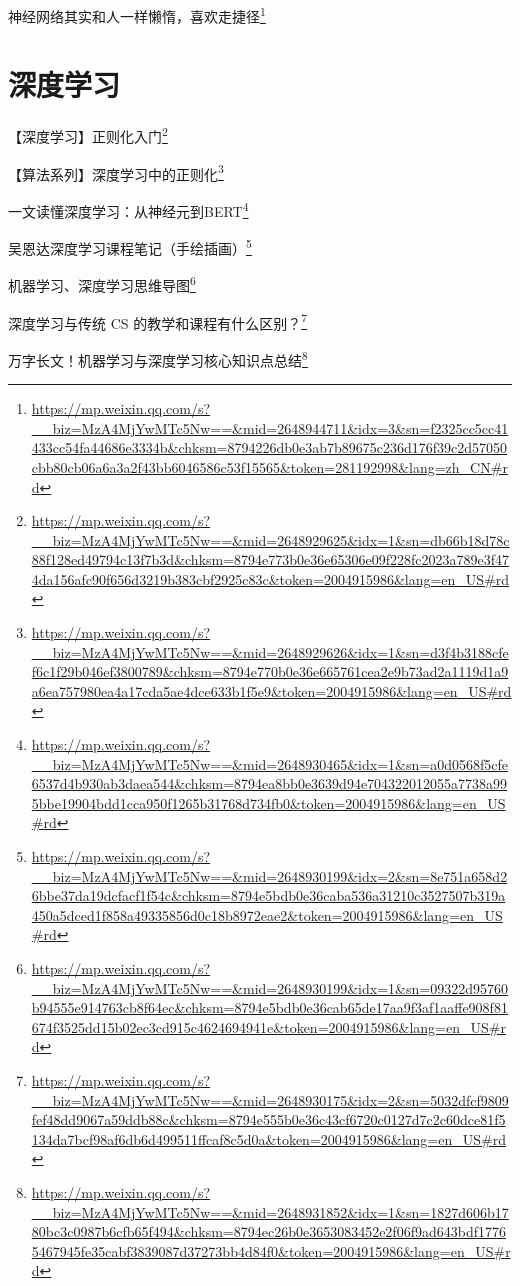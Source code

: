 \documentclass[]{ctexbook}
\renewcommand{\href}[2]{#2\footnote{\url{#1}}}
\begin{document}
\href{https://mp.weixin.qq.com/s?__biz=MzA4MjYwMTc5Nw==\&mid=2648944711\&idx=3\&sn=f2325cc5cc41433cc54fa44686e3334b\&chksm=8794226db0e3ab7b89675c236d176f39c2d57050cbb80cb06a6a3a2f43bb6046586c53f15565\&token=281192998\&lang=zh_CN\#rd}{神经网络其实和人一样懒惰，喜欢走捷径}

\hypertarget{ux6df1ux5ea6ux5b66ux4e60-1}{%
\section{深度学习}\label{ux6df1ux5ea6ux5b66ux4e60-1}}

\href{https://mp.weixin.qq.com/s?__biz=MzA4MjYwMTc5Nw==\&mid=2648929625\&idx=1\&sn=db66b18d78c88f128ed49794c13f7b3d\&chksm=8794e773b0e36e65306e09f228fc2023a789e3f474da156afc90f656d3219b383cbf2925c83c\&token=2004915986\&lang=en_US\#rd}{【深度学习】正则化入门}

\href{https://mp.weixin.qq.com/s?__biz=MzA4MjYwMTc5Nw==\&mid=2648929626\&idx=1\&sn=d3f4b3188cfef6c1f29b046ef3800789\&chksm=8794e770b0e36e665761cea2e9b73ad2a1119d1a9a6ea757980ea4a17cda5ae4dce633b1f5e9\&token=2004915986\&lang=en_US\#rd}{【算法系列】深度学习中的正则化}

\href{https://mp.weixin.qq.com/s?__biz=MzA4MjYwMTc5Nw==\&mid=2648930465\&idx=1\&sn=a0d0568f5cfe6537d4b930ab3daea544\&chksm=8794ea8bb0e3639d94e704322012055a7738a995bbe19904bdd1cca950f1265b31768d734fb0\&token=2004915986\&lang=en_US\#rd}{一文读懂深度学习：从神经元到BERT}

\href{https://mp.weixin.qq.com/s?__biz=MzA4MjYwMTc5Nw==\&mid=2648930199\&idx=2\&sn=8e751a658d26bbe37da19dcfacf1f54c\&chksm=8794e5bdb0e36caba536a31210c3527507b319a450a5dced1f858a49335856d0c18b8972eae2\&token=2004915986\&lang=en_US\#rd}{吴恩达深度学习课程笔记（手绘插画）}

\href{https://mp.weixin.qq.com/s?__biz=MzA4MjYwMTc5Nw==\&mid=2648930199\&idx=1\&sn=09322d95760b94555e914763cb8f64ec\&chksm=8794e5bdb0e36cab65de17aa9f3af1aaffe908f81674f3525dd15b02ec3cd915c4624694941e\&token=2004915986\&lang=en_US\#rd}{机器学习、深度学习思维导图}

\href{https://mp.weixin.qq.com/s?__biz=MzA4MjYwMTc5Nw==\&mid=2648930175\&idx=2\&sn=5032dfcf9809fef48dd9067a59ddb88c\&chksm=8794e555b0e36c43cf6720c0127d7c2c60dce81f5134da7bcf98af6db6d499511ffcaf8c5d0a\&token=2004915986\&lang=en_US\#rd}{深度学习与传统 CS 的教学和课程有什么区别？}

\href{https://mp.weixin.qq.com/s?__biz=MzA4MjYwMTc5Nw==\&mid=2648931852\&idx=1\&sn=1827d606b1780bc3c0987b6cfb65f494\&chksm=8794ec26b0e3653083452e2f06f9ad643bdf17765467945fe35cabf3839087d37273bb4d84f0\&token=2004915986\&lang=en_US\#rd}{万字长文！机器学习与深度学习核心知识点总结}
\end{document}
